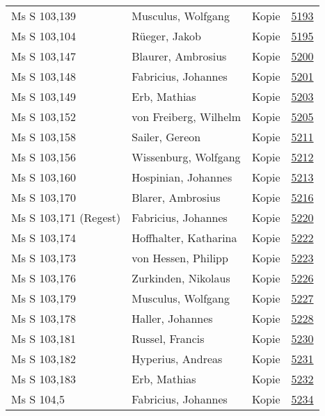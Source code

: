 \documentclass[10pt,a4paper,landscape]{report}
\begin{document}
\begin{longtable}{p{16cm}p{4cm}lr}
Ms S 103,139	&	Musculus, Wolfgang	&	Kopie	&	\href{http://130.60.24.72/assignment/5193}{5193}\\
Ms S 103,104	&	Rüeger, Jakob	&	Kopie	&	\href{http://130.60.24.72/assignment/5195}{5195}\\
Ms S 103,147	&	Blaurer, Ambrosius	&	Kopie	&	\href{http://130.60.24.72/assignment/5200}{5200}\\
Ms S 103,148	&	Fabricius, Johannes	&	Kopie	&	\href{http://130.60.24.72/assignment/5201}{5201}\\
Ms S 103,149	&	Erb, Mathias	&	Kopie	&	\href{http://130.60.24.72/assignment/5203}{5203}\\
Ms S 103,152	&	von Freiberg, Wilhelm	&	Kopie	&	\href{http://130.60.24.72/assignment/5205}{5205}\\
Ms S 103,158	&	Sailer, Gereon	&	Kopie	&	\href{http://130.60.24.72/assignment/5211}{5211}\\
Ms S 103,156	&	Wissenburg, Wolfgang	&	Kopie	&	\href{http://130.60.24.72/assignment/5212}{5212}\\
Ms S 103,160	&	Hospinian, Johannes	&	Kopie	&	\href{http://130.60.24.72/assignment/5213}{5213}\\
Ms S 103,170	&	Blarer, Ambrosius	&	Kopie	&	\href{http://130.60.24.72/assignment/5216}{5216}\\
Ms S 103,171 (Regest)	&	Fabricius, Johannes	&	Kopie	&	\href{http://130.60.24.72/assignment/5220}{5220}\\
Ms S 103,174	&	Hoffhalter, Katharina	&	Kopie	&	\href{http://130.60.24.72/assignment/5222}{5222}\\
Ms S 103,173	&	von Hessen, Philipp	&	Kopie	&	\href{http://130.60.24.72/assignment/5223}{5223}\\
Ms S 103,176	&	Zurkinden, Nikolaus	&	Kopie	&	\href{http://130.60.24.72/assignment/5226}{5226}\\
Ms S 103,179	&	Musculus, Wolfgang	&	Kopie	&	\href{http://130.60.24.72/assignment/5227}{5227}\\
Ms S 103,178	&	Haller, Johannes	&	Kopie	&	\href{http://130.60.24.72/assignment/5228}{5228}\\
Ms S 103,181	&	Russel, Francis	&	Kopie	&	\href{http://130.60.24.72/assignment/5230}{5230}\\
Ms S 103,182	&	Hyperius, Andreas	&	Kopie	&	\href{http://130.60.24.72/assignment/5231}{5231}\\
Ms S 103,183	&	Erb, Mathias	&	Kopie	&	\href{http://130.60.24.72/assignment/5232}{5232}\\
Ms S 104,5	&	Fabricius, Johannes	&	Kopie	&	\href{http://130.60.24.72/assignment/5234}{5234}\\

\end{longtable}
\end{document}
